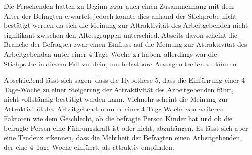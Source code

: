 Die Forschenden hatten zu Beginn zwar auch einen Zusammenhang mit dem Alter der Befragten erwartet, jedoch konnte dies anhand
der Stichprobe nicht bestätigt werden da sich die Meinung zur Attraktivität des Arbeitgebenden nicht signifikant zwischen den 
Altersgruppen unterschied.
Abseits davon scheint die Branche der Befragten zwar einen Einfluss auf die Meinung zur Attraktivität des Arbeitgebenden unter einer 4-Tage-Woche
zu haben, allerdings war die Stichprobe in diesem Fall zu klein, um belastbare Aussagen treffen zu können.

Abschließend lässt sich sagen, dass die Hypothese 5, dass die Einführung einer 4-Tage-Woche zu einer Steigerung der Attraktivität des Arbeitgebenden führt,
nicht vollständig bestätigt werden kann. Vielmehr scheint die Meinung zur Attraktivität des Arbeitgebenden unter einer 4-Tage-Woche von weiteren Faktoren
wie dem Geschlecht, ob die befragte Person Kinder hat und ob die befragte Person eine Führungskraft ist oder nicht, abzuhängen.
Es lässt sich aber eine Tendenz erkennen, dass die Mehrheit der Befragten einen Arbeitgebenden, der eine 4-Tage-Woche einführt, als attraktiv empfinden.